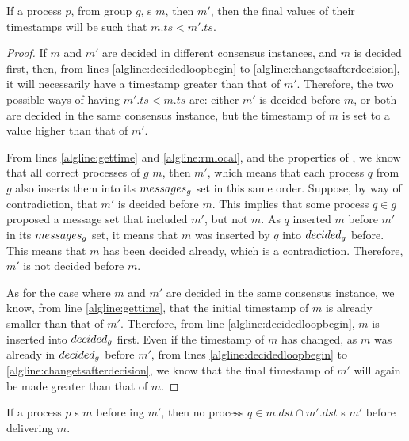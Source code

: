 \documentclass[times, 10pt]{article}
\begin{document}
\begin{lems} \label{lemma:fifofinalts}
If a process $p$, from group $g$, \amcast{}s $m$, then $m'$, then the final values of their timestamps will be such that $m.ts < m'.ts$.
\end{lems}

\begin{proof}
If $m$ and $m'$ are decided in different consensus instances, and $m$ is decided first, then, from lines \ref{algline:decidedloopbegin} to \ref{algline:changetsafterdecision}, it will necessarily have a timestamp greater than that of $m'$. Therefore, the two possible ways of having $m'.ts < m.ts$ are: either $m'$ is decided before $m$, or both are decided in the same consensus instance, but the timestamp of $m$ is set to a value higher than that of $m'$.

From lines \ref{algline:gettime} and \ref{algline:rmlocal}, and the properties of \rmcast{}, we know that all correct processes of $g$ \rmdel{} $m$, then $m'$, which means that each process $q$ from $g$ also inserts them into its $messages\text{$_g$}$ set in this same order. Suppose, by way of contradiction, that $m'$ is decided before $m$. This implies that some process $q \in g$ proposed a message set that included $m'$, but not $m$. As $q$ inserted $m$ before $m'$ in its $messages\text{$_g$}$ set, it means that $m$ was inserted by $q$ into $decided\text{$_g$}$ before. This means that $m$ has been decided already, which is a contradiction. Therefore, $m'$ is not decided before $m$.

As for the case where $m$ and $m'$ are decided in the same consensus instance, we know, from line \ref{algline:gettime}, that the initial timestamp of $m$ is already smaller than that of $m'$. Therefore, from line \ref{algline:decidedloopbegin}, $m$ is inserted into $decided\text{$_g$}$ first. Even if the timestamp of $m$ has changed, as $m$ was already in $decided\text{$_g$}$ before $m'$, from lines \ref{algline:decidedloopbegin} to \ref{algline:changetsafterdecision}, we know that the final timestamp of $m'$ will again be made greater than that of $m$.
\end{proof}






\begin{props} \label{props:fifoorder}
If a process $p$ \amcast{}s $m$ before \amcast{}ing $m'$, then no process $q \in m.dst \cap m'.dst$ \amdel{}s $m'$ before delivering $m$.
\end{props}
\end{document}
